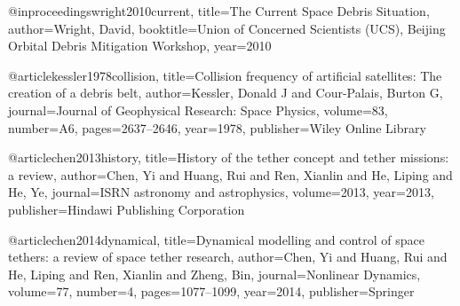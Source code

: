 @inproceedings{wright2010current,
  title={The Current Space Debris Situation},
  author={Wright, David},
  booktitle={Union of Concerned Scientists (UCS), Beijing Orbital Debris Mitigation Workshop},
  year={2010}
}

@article{kessler1978collision,
  title={Collision frequency of artificial satellites: The creation of a debris belt},
  author={Kessler, Donald J and Cour-Palais, Burton G},
  journal={Journal of Geophysical Research: Space Physics},
  volume={83},
  number={A6},
  pages={2637--2646},
  year={1978},
  publisher={Wiley Online Library}
}

@article{chen2013history,
  title={History of the tether concept and tether missions: a review},
  author={Chen, Yi and Huang, Rui and Ren, Xianlin and He, Liping and He, Ye},
  journal={ISRN astronomy and astrophysics},
  volume={2013},
  year={2013},
  publisher={Hindawi Publishing Corporation}
}

@article{chen2014dynamical,
  title={Dynamical modelling and control of space tethers: a review of space tether research},
  author={Chen, Yi and Huang, Rui and He, Liping and Ren, Xianlin and Zheng, Bin},
  journal={Nonlinear Dynamics},
  volume={77},
  number={4},
  pages={1077--1099},
  year={2014},
  publisher={Springer}
}

